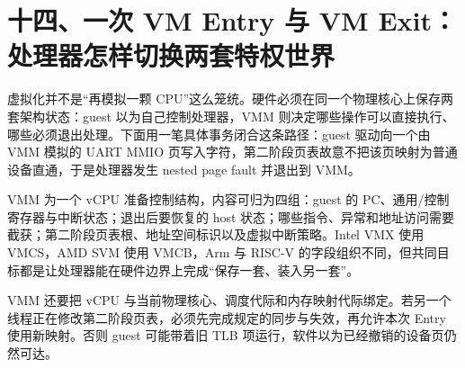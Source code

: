 \section{十四、一次 VM Entry 与 VM Exit：处理器怎样切换两套特权世界}

虚拟化并不是“再模拟一颗 CPU”这么笼统。硬件必须在同一个物理核心上保存两套架构状态：guest 以为自己控制处理器，VMM 则决定哪些操作可以直接执行、哪些必须退出处理。下面用一笔具体事务闭合这条路径：guest 驱动向一个由 VMM 模拟的 UART MMIO 页写入字符，第二阶段页表故意不把该页映射为普通设备直通，于是处理器发生 nested page fault 并退出到 VMM。\cite{intel-sdm}


VMM 为一个 vCPU 准备控制结构，内容可归为四组：guest 的 PC、通用/控制寄存器与中断状态；退出后要恢复的 host 状态；哪些指令、异常和地址访问需要截获；第二阶段页表根、地址空间标识以及虚拟中断策略。Intel VMX 使用 VMCS，AMD SVM 使用 VMCB，Arm 与 RISC-V 的字段组织不同，但共同目标都是让处理器能在硬件边界上完成“保存一套、装入另一套”。

VMM 还要把 vCPU 与当前物理核心、调度代际和内存映射代际绑定。若另一个线程正在修改第二阶段页表，必须先完成规定的同步与失效，再允许本次 Entry 使用新映射。否则 guest 可能带着旧 TLB 项运行，软件以为已经撤销的设备页仍然可达。

